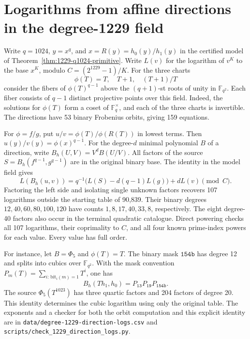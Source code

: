 \documentclass[11pt]{article}
\begin{document}
\section{Logarithms from affine directions in the degree-1229 field}
\label{sec:1229-direction-logs}
Write \(q=1024\), \(y=x^q\), and \(x=R(y)=h_0(y)/h_1(y)\) in the
certified model of Theorem~\ref{thm:1229-q1024-primitive}. Write
\(L(v)\) for the logarithm of \(v^K\) to the base \(x^K\), modulo
\(C=(2^{1229}-1)/K\). For the three charts
\[
 \phi(T)=T,\quad T+1,\quad (T+1)/T
\]
consider the fibers of \(\phi(T)^{q-1}\) above the \((q+1)\)-st roots
of unity in \(\mathbb F_{q^2}\). Each fiber consists of \(q-1\)
distinct projective points over this field. Indeed, the solutions for
\(\phi(T)\) form a coset of \(\mathbb F_q^\times\), and each of the
three charts is invertible. The directions have 53 binary Frobenius
orbits, giving 159 equations.

For \(\phi=f/g\), put \(u/v=\phi(T)/\phi(R(T))\) in lowest terms.
Then \(u(y)/v(y)=\phi(x)^{q-1}\). For the degree-\(d\) minimal
polynomial \(B\) of a direction, write \(B_h(U,V)=V^dB(U/V)\).
All factors of the source
\(S=B_h(f^{q-1},g^{q-1})\) are in the original binary base.
The identity in the model field gives
\[
 L(B_h(u,v)) = q^{-1}\bigl(L(S)-d(q-1)L(g)\bigr)+dL(v)\pmod C.
\]
Factoring the left side and isolating single unknown factors
recovers 107 logarithms outside the starting table of 90,839.
Their binary degrees \(12,40,60,80,100,120\) have counts
\(1,8,17,40,33,8\), respectively. The eight degree-40 factors
also occur in the terminal quadratic catalogue. Direct powering
checks all 107 logarithms, their coprimality to \(C\), and all four
known prime-index powers for each value. Every value has full order.

For instance, let \(B=\Phi_5\) and \(\phi(T)=T\).
The binary mask \(\mathtt{154b}\) has degree 12 and splits into
cubics over \(\mathbb F_{q^2}\). With the mask convention
\(P_m(T)=\sum_{i:\,\mathrm{bit}_i(m)=1}T^i\), one has
\[
 B_h(Th_1,h_0)=P_{\mathtt{13}}P_{\mathtt{19}}P_{\mathtt{154b}}.
\]
The source \(\Phi_5(T^{1023})\) has three quartic factors and
204 factors of degree 20. This identity determines the cubic
logarithm using only the original table. The exponents and
a checker for both the orbit computation and this explicit identity
are in \nolinkurl{data/degree-1229-direction-logs.csv} and
\nolinkurl{scripts/check_1229_direction_logs.py}.
\end{document}
